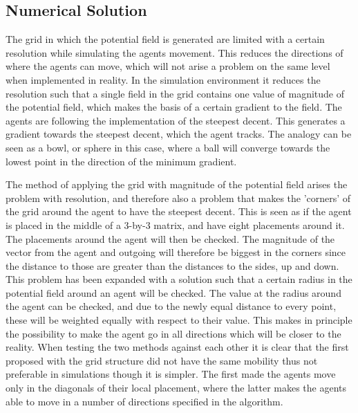\subsection{Numerical Solution}
\label{subsec:numsol}
The grid in which the potential field is generated are limited with a
certain resolution while simulating the agents movement. This reduces
the directions of where the agents can move, which will not arise a
problem on the same level when implemented in reality. In the
simulation environment it reduces the resolution such that a single
field in the grid contains one value of magnitude of the potential
field, which makes the basis of a certain gradient to the field. The
agents are following the implementation of the steepest decent. This
generates a gradient towards the steepest decent, which the agent
tracks. The analogy can be seen as a bowl, or sphere in this case,
where a ball will converge towards the lowest point in the direction
of the minimum gradient.

The method of applying the grid with magnitude of the potential field
arises the problem with resolution, and therefore also a problem that makes the
'corners' of the grid around the agent to have the
steepest decent. This is seen as if the agent is placed in the middle
of a 3-by-3 matrix, and have eight placements around it. The placements around the agent will then be checked. The magnitude of the vector from the agent and outgoing will therefore be biggest in the corners since the distance to those are greater than the distances to the sides, up and down. This problem
has been expanded with a solution such that a certain radius in the
potential field around an agent will be checked. The value at the
radius around the agent can be checked, and due to the newly equal distance
to every point, these will be weighted equally with respect to their
value. This makes in principle the possibility to make the agent go in
all directions which will be closer to the reality. When testing the
two methods against each other it is clear that the first proposed
with the grid structure did not have the same mobility thus not
preferable in simulations though it is simpler. The first made the agents move only in the diagonals of their local placement, where the latter makes the agents able to move in a number of directions specified in the algorithm.

